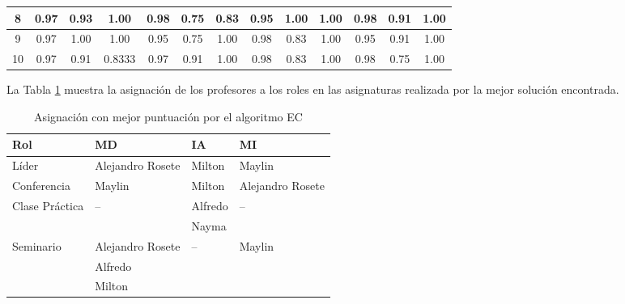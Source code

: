 \begin{table}[H]
\begin{tabular}{|c | c | c| c | c |c |c | c| c| c | c| c|c |}
		          8            & 0.97                     & 0.93                     & 1.00                     & 0.98 & 0.75 & 0.83       & 0.95 & 1.00 & 1.00      & 0.98   & 0.91 &  1.00   \\ \hline
		          9            &  0.97  &  1.00 &  1.00 & 0.95 & 0.75 & 1.00       & 0.98 & 0.83 & 1.00      & 0.95   & 0.91 &  1.00   \\ \hline
		          10           & 0.97                     & 0.91                     & 0.8333                   & 0.97 & 0.91 & 1.00       & 0.98 & 0.83 & 1.00      & 0.98   & 0.75 &  1.00   \\ \bottomrule
	\end{tabular}
\end{table}

La Tabla \ref{table:asingnacion-doc} muestra la asignación de los profesores a los roles en las asignaturas realizada por la mejor solución encontrada.

\begin{table}[H]
	\centering
	\caption{Asignación con mejor puntuación por el algoritmo EC} \label{table:asingnacion-doc}
	\begin{tabular}{l p{3.3cm} l l}
		\toprule
		\textbf{Rol}                               & \textbf{MD}                    & \textbf{IA}                    & \textbf{MI}                        \\ \midrule
		Líder                             & Alejandro Rosete      & Milton                & Maylin                    \\ \hline
		Conferencia                       & Maylin                & Milton                & Alejandro Rosete          \\ \hline
		\multirow{2}{3cm}{Clase Práctica} & \multirow{2}{2cm}{--} & Alfredo               & \multirow{2}{2cm}{--}     \\
		                                  &                       & Nayma                 &  \\ \hline
		\multirow{3}{2cm}{Seminario}      & Alejandro Rosete      & \multirow{3}{2cm}{--} & \multirow{3}{2cm}{Maylin} \\
		                                  & Alfredo               &                       &  \\
		                                  & Milton                &                       &  \\ \bottomrule
	\end{tabular}
\end{table}
 
